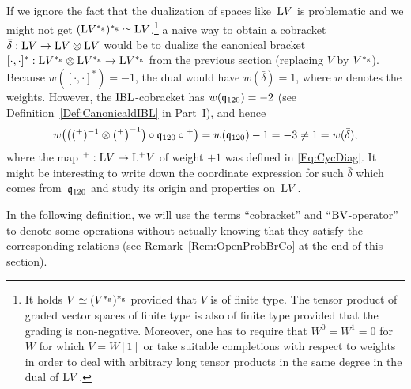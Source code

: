 \documentclass[\MainFolder/Text.tex]{subfiles}
\begin{document}
\begin{Remark}
If we ignore the fact that the dualization of spaces like~$\mathrm{L} V$ is problematic and we might not get $(\mathrm{L} V^{*_{\mathrm{g}}})^{*_{\mathrm{g}}}\simeq \mathrm{L} V$,\footnote{It holds $V\simeq (V^{*_{\mathrm{g}}})^{*_{\mathrm{g}}}$ provided that $V$ is of finite type. The tensor product of graded vector spaces of finite type is also of finite type provided that the grading is non-negative. Moreover, one has to require that $W^0 =W^1=0$ for $W$ for which $V=W[1]$ or take suitable completions with respect to weights in order to deal with arbitrary long tensor products in the same degree in the dual of $\mathrm{L} V$.} a naive way to obtain a cobracket $\bar{\delta}: \mathrm{L} V\rightarrow\mathrm{L} V \otimes\mathrm{L} V$ would be to dualize the  canonical bracket $[\cdot,\cdot]^*: \mathrm{L} V^{*_{\mathrm{g}}} \otimes \mathrm{L} V^{*_{\mathrm{g}}} \rightarrow \mathrm{L} V^{*_{\mathrm{g}}}$ from the previous section (replacing $V$ by $V^{*_{\mathrm{g}}}$). Because $w([\cdot,\cdot]^*) = -1$, the dual would have $w(\bar{\delta}) = 1$, where $w$ denotes the weights. However, the $\mathrm{IBL}$-cobracket has $w(\mathfrak{q}_{120})=-2$ (see Definition~\ref{Def:CanonicaldIBL} in Part~I), and hence 
\[w\bigl(\bigl(({}^+)^{-1}\otimes({}^+\bigr)^{-1}\bigr)\circ\mathfrak{q}_{120}\circ{}^+\bigr) = w(\mathfrak{q}_{120}) - 1 = - 3 \neq 1 = w(\bar{\delta}), \]
where the map ${}^+: \mathrm{L} V\rightarrow\mathrm{L}^+ V$ of weight $+1$ was defined in \eqref{Eq:CycDiag}. It might be interesting to write down the coordinate expression for such $\bar{\delta}$ which comes from~$\mathfrak{q}_{120}$ and study its origin and properties on~$\mathrm{L} V$.
\end{Remark}

In the following definition, we will use the terms ``cobracket'' and ``$\mathrm{BV}$-operator'' to denote some operations without actually knowing that they satisfy the corresponding relations (see Remark~\ref{Rem:OpenProbBrCo} at the end of this section).
 
\end{document}
